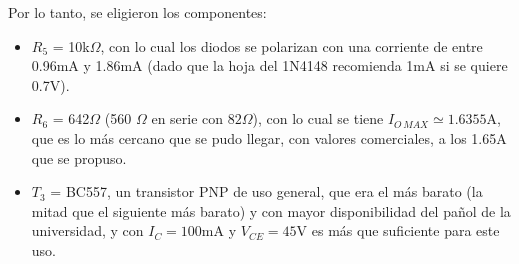 \documentclass[e2_tp1_main.tex]{subfiles}
\begin{document}
Por lo tanto, se eligieron los componentes:

\begin{itemize}
	\item $R_5$ = 10k$\Omega$, con lo cual los diodos se polarizan con una corriente de entre 0.96mA y 1.86mA (dado que la hoja del 1N4148 recomienda 1mA si se quiere 0.7V).
	\item $R_6$ = 642$\Omega$ (560 $\Omega$ en serie con $82\Omega$), con lo cual se tiene $I_{O\, MAX} \simeq 1.6355$A, que es lo m\'as cercano que se pudo llegar, con valores comerciales, a los 1.65A que se propuso.
	\item $T_3$ = BC557, un transistor PNP de uso general, que era el m\'as barato (la mitad que el siguiente m\'as barato) y con mayor disponibilidad del pa\~nol de la universidad, y con $I_C = 100$mA y $V_{CE}=45$V es m\'as que suficiente para este uso.
\end{itemize}
\end{document}
